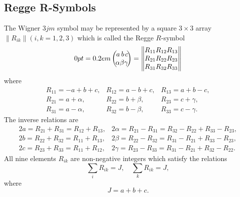 \subsection{Regge R-Symbols}\label{sec:8.1.3}
The Wigner $3 j m$ symbol may be represented by a square $3 \times 3$ array $\left\|R_{i k}\right\|(i, k=1,2,3)$ which is called the Regge $R$-symbol \cite{ref094}
\begin{equation}
\threej{a}{b}{c}{\alpha}{\beta}{\gamma}\label{eq:8:1:14}=\begin{Vmatrix}
R_{11} & R_{12} & R_{13} \\
R_{21} & R_{22} & R_{23} \\
R_{31} & R_{32} & R_{33}
\end{Vmatrix}
\end{equation}
where
\begin{equation}
\begin{array}{lll}
R_{11}=-a+b+c, & R_{12}=a-b+c, & R_{13}=a+b-c, \\
R_{21}=a+\alpha, & R_{22}=b+\beta, & R_{23}=c+\gamma, \\
R_{31}=a-\alpha, & R_{32}=b-\beta, & R_{33}=c-\gamma. \label{eq:8:1:15}
\end{array}
\end{equation}
The inverse relations are
\begin{equation}
\begin{array}{ll}
2 a=R_{21}+R_{31}=R_{12}+R_{13}, & 2 \alpha=R_{21}-R_{31}=R_{32}-R_{22}+R_{33}-R_{23}, \\
2 b=R_{22}+R_{32}=R_{11}+R_{13}, & 2 \beta=R_{22}-R_{32}=R_{31}-R_{21}+R_{33}-R_{23}, \\
2 c=R_{23}+R_{33}=R_{11}+R_{12}, & 2 \gamma=R_{23}-R_{33}=R_{31}-R_{21}+R_{32}-R_{22} . \label{eq:8:1:16}
\end{array}
\end{equation}
All nine elements $R_{i k}$ are non-negative integers which satisfy the relations
\begin{equation}
\sum_{i} R_{i k}=J, \quad \sum_{k} R_{i k}=J, \label{eq:8:1:17}
\end{equation}
where
\begin{equation}
J=a+b+c. \label{eq:8:1:18}
\end{equation}
